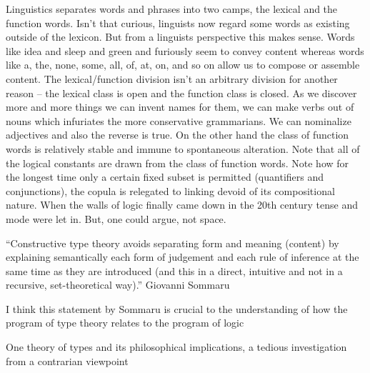 \documentclass[dah,phd,a4paper]{xe_uccthesis}
\begin{document}
Linguistics separates words and phrases into two camps, the lexical and the function words. Isn't that curious, linguists now regard some words as existing outside of the lexicon. But from a linguists perspective this makes sense. Words like idea and sleep and green and furiously seem to convey content whereas words like a, the, none, some, all, of, at, on, and so on allow us to compose or assemble content. The lexical/function division isn't an arbitrary division for another reason – the lexical class is open and the function class is closed. As we discover more and more things we can invent names for them, we can make verbs out of nouns which infuriates the more conservative grammarians. We can nominalize adjectives and also the reverse is true. On the other hand the class of function words is relatively stable and immune to spontaneous alteration. Note that all of the logical constants are drawn from the class of function words. Note how for the longest time only a certain fixed subset is permitted (quantifiers and conjunctions), the copula is relegated to linking devoid of its compositional nature. When the walls of logic finally came down in the 20th century tense and mode were let in. But, one could argue, not space.

“Constructive type theory avoids separating form and meaning (content) by explaining semantically each form of judgement and each rule of inference at the same time as they are introduced (and this in a direct, intuitive and not in a recursive, set-theoretical way).”
Giovanni Sommaru

I think this statement by Sommaru is crucial to the understanding of how the program of type theory relates to the program of logic

One theory of types and its philosophical implications, a tedious investigation from a contrarian viewpoint
\end{document}
